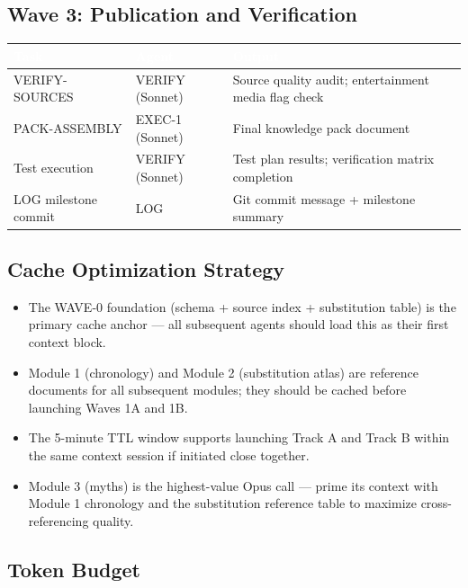 \documentclass[11pt,letterpaper]{article}
\newcommand{\tableheader}[1]{\textbf{\sffamily\textcolor{white}{#1}}}
\begin{document}
\subsection{Wave 3: Publication and Verification}

\begin{center}
\begin{tabularx}{\textwidth}{L{3.5cm}L{2.5cm}X}
\toprule
{}
\tableheader{Task} & \tableheader{Agent} & \tableheader{Output} \\
\midrule
VERIFY-SOURCES & VERIFY (Sonnet) & Source quality audit; entertainment media flag check \\
PACK-ASSEMBLY & EXEC-1 (Sonnet) & Final knowledge pack document \\
Test execution & VERIFY (Sonnet) & Test plan results; verification matrix completion \\
LOG milestone commit & LOG & Git commit message + milestone summary \\
\bottomrule
\end{tabularx}
\end{center}

\subsection{Cache Optimization Strategy}

\begin{itemize}[leftmargin=2em]
  \item The WAVE-0 foundation (schema + source index + substitution table) is the primary cache anchor --- all subsequent agents should load this as their first context block.
  \item Module 1 (chronology) and Module 2 (substitution atlas) are reference documents for all subsequent modules; they should be cached before launching Waves 1A and 1B.
  \item The 5-minute TTL window supports launching Track A and Track B within the same context session if initiated close together.
  \item Module 3 (myths) is the highest-value Opus call --- prime its context with Module 1 chronology and the substitution reference table to maximize cross-referencing quality.
\end{itemize}

\subsection{Token Budget}
\end{document}

